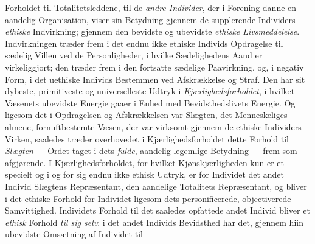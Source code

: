Forholdet til Totalitetsleddene, til de \emph{andre Individer}, der i Forening
danne en aandelig Organisation, viser sin Betydning gjennem de supplerende
Individers \emph{ethiske} Indvirkning; gjennem den bevidste og ubevidste
\emph{ethiske Livsmeddelelse}. Indvirkningen træder frem i det endnu ikke ethiske
Individs Opdragelse til sædelig Villen ved de Personligheder, i hvilke
Sædelighedens Aand er virkeliggjort; den træder frem i den fortsatte sædelige
Paavirkning, og, i negativ Form, i det uethiske Individs Bestemmen ved
Afskrækkelse og Straf. Den har sit dybeste, primitiveste og universelleste Udtryk
i \emph{Kjærlighedsforholdet}, i hvilket
 Væsenets ubevidste Energie gaaer i Enhed med Bevidsthedslivets Energie. Og
ligesom det i Opdragelsen og Afskrækkelsen var Slægten, det Menneskeliges almene,
fornuftbestemte Væsen, der var virksomt gjennem de ethiske Individers Virken,
saaledes træder overhovedet i Kjærlighedsforholdet dette Forhold til
\emph{Slægten} --- Ordet taget i dets \emph{fulde}, aandelig-legemlige Betydning
--- frem som afgjørende. I Kjærlighedsforholdet, for hvilket Kjønskjærligheden
kun er et specielt og i og for sig endnu ikke ethisk Udtryk, er for Individet det
andet Individ Slægtens Repræsentant, den aandelige Totalitets Repræsentant, og
bliver i det ethiske Forhold for Individet ligesom dets personificerede,
objectiverede Samvittighed. Individets Forhold til det saaledes opfattede andet
Individ bliver et \emph{ethisk} Forhold \emph{til sig selv}: i det andet Individs
Bevidsthed har det, gjennem hiin ubevidste Omsætning af Individet til
